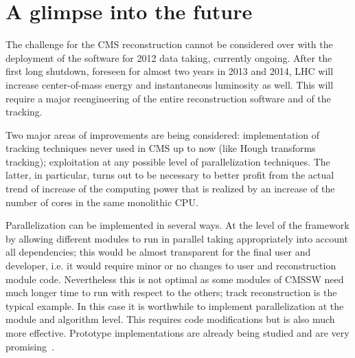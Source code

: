 \section{A glimpse into the future}
\label{glimpse}

The challenge for the CMS reconstruction cannot be considered over
with the deployment of the software for 2012 data taking, currently
ongoing. After the first long shutdown, foreseen for almost two years
in 2013 and 2014, LHC will increase center-of-mass energy
and instantaneous luminosity as well. This will require a major
reengineering of the entire reconstruction software and of the
tracking.

Two major areas of improvements are being considered: implementation of
tracking techniques never used in CMS up to now (like Hough transforms
tracking); exploitation at any possible level of parallelization
techniques. The latter, in particular, turns out to be necessary to
better profit from the actual trend of increase of the computing power
that is realized by an increase of the number of cores in the same
monolithic CPU.

Parallelization can be implemented in several ways. At the level of
the framework by allowing different modules to run in parallel taking
appropriately into account all dependencies; this would be almost
transparent for the final user and developer, i.e. it would require
minor or no changes to user and reconstruction module code. Nevertheless
this is not optimal as some modules of CMSSW need much longer time
to run with respect to the others; track reconstruction is the
typical example. In this case it is worthwhile to implement
parallelization at the module and algorithm level. This requires code
modifications but is also much more effective. Prototype
implementations are already being studied and are very
promising~\cite{parallel}.




